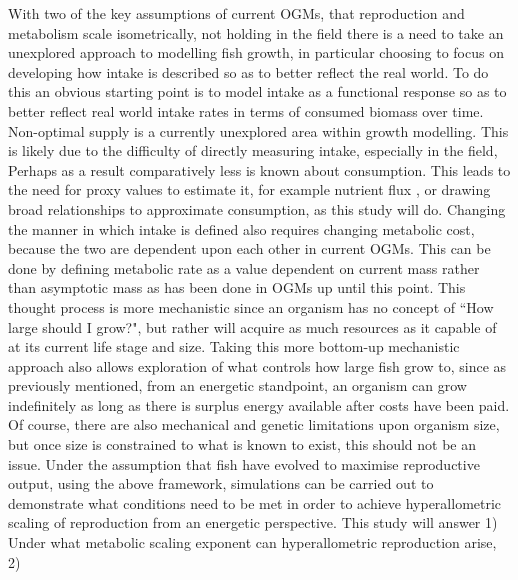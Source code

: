 \documentclass[a4paper, 11pt, hidelinks]{article} %
\begin{document}
	With two of the key assumptions of current OGMs, that reproduction and metabolism scale isometrically, not holding in the field \parencite{Barneche2018, Pawar2012, Peters1983} there is a need to take an unexplored approach to modelling fish growth, in particular choosing to focus on developing how intake is described so as to better reflect the real world.  To do this an obvious starting point is to model intake as a functional response \parencite{Holling1959} so as to better reflect real world intake rates in terms of consumed biomass over time.  Non-optimal supply is a currently unexplored area within growth modelling.  This is likely due to the difficulty of directly measuring intake, especially in the field, Perhaps as a result comparatively less is known about consumption.  This leads to the need for proxy values to estimate it, for example nutrient flux \parencite{Schiettekatte2020}, or drawing broad relationships to approximate consumption, as this study will do.
	Changing the manner in which intake is defined also requires changing metabolic cost, because the two are dependent upon each other in current OGMs.  This can be done by defining metabolic rate as a value dependent on current mass rather than asymptotic mass as has been done in OGMs up until this point.  This thought process is more mechanistic since an organism has no concept of ``How large should I grow?", but rather will acquire as much resources as it capable of at its current life stage and size.  Taking this more bottom-up mechanistic approach also allows exploration of what controls how large fish grow to, since as previously mentioned, from an energetic standpoint, an organism can grow indefinitely as long as there is surplus energy available after costs have been paid.  Of course, there are also mechanical and genetic limitations upon organism size, but once size is constrained to what is known to exist, this should not be an issue.  
	Under the assumption that fish have evolved to maximise reproductive output, using the above framework, simulations can be carried out to demonstrate what conditions need to be met in order to achieve hyperallometric scaling of reproduction from an energetic perspective.  This study will answer 1) Under what metabolic scaling exponent can hyperallometric reproduction arise, 2) 
	
\end{document}
